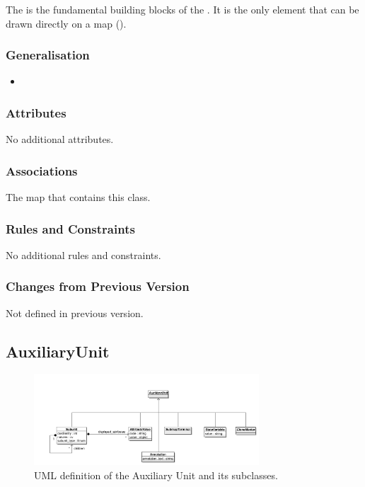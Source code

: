 The  is the fundamental building blocks of the
\PDl. It is the only element that can be drawn directly on a map
().

\subsubsection{Generalisation}

\begin{itemize}
\item {}
\end{itemize}

\subsubsection{Attributes}

No additional attributes.

\subsubsection{Associations}

\begin{attributes}
 The map that contains this class.
\end{attributes}

\subsubsection{Rules and Constraints}

No additional rules and constraints.

\subsubsection{Changes from Previous Version}

Not defined in  previous version.


\subsection{AuxiliaryUnit}
\label{defn:AuxiliaryUnit}

\begin{figure}[htb]
  \centering
  \includegraphics[width=0.75\textwidth]{images/auxiliaryunituml}
\caption{UML definition of the Auxiliary Unit and its subclasses.}
  \label{fig:auxiliaryunituml}
\end{figure}

